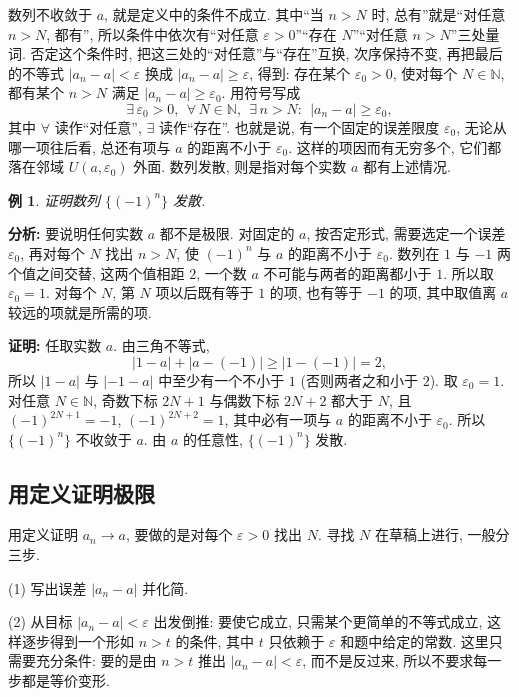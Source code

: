 \documentclass[UTF8,openany]{ctexbook}
\theoremstyle{chinesetextbook}
\newtheorem{example}{例}[section]
\newenvironment{cnproof}{\par\indent\textbf{证明:} \ignorespaces}{\par}
\begin{document}
数列不收敛于 $a$, 就是定义中的条件不成立. 其中“当 $n>N$ 时, 总有”就是“对任意 $n>N$, 都有”, 所以条件中依次有“对任意 $\varepsilon>0$”“存在 $N$”“对任意 $n>N$”三处量词. 否定这个条件时, 把这三处的“对任意”与“存在”互换, 次序保持不变, 再把最后的不等式 $|a_n-a|<\varepsilon$ 换成 $|a_n-a|\ge\varepsilon$, 得到: 存在某个 $\varepsilon_0>0$, 使对每个 $N\in\mathbb N$, 都有某个 $n>N$ 满足 $|a_n-a|\ge\varepsilon_0$. 用符号写成
\[
\exists\,\varepsilon_0>0,\ \ \forall\,N\in\mathbb N,\ \ \exists\,n>N:\ \ |a_n-a|\ge\varepsilon_0,
\]
其中 $\forall$ 读作“对任意”, $\exists$ 读作“存在”. 也就是说, 有一个固定的误差限度 $\varepsilon_0$, 无论从哪一项往后看, 总还有项与 $a$ 的距离不小于 $\varepsilon_0$. 这样的项因而有无穷多个, 它们都落在邻域 $U(a,\varepsilon_0)$ 外面. 数列发散, 则是指对每个实数 $a$ 都有上述情况.
\begin{example}\label{ex:12-div}
证明数列 $\{(-1)^n\}$ 发散.
\end{example}
\par\indent\textbf{分析:} 要说明任何实数 $a$ 都不是极限. 对固定的 $a$, 按否定形式, 需要选定一个误差 $\varepsilon_0$, 再对每个 $N$ 找出 $n>N$, 使 $(-1)^n$ 与 $a$ 的距离不小于 $\varepsilon_0$. 数列在 $1$ 与 $-1$ 两个值之间交替, 这两个值相距 $2$, 一个数 $a$ 不可能与两者的距离都小于 $1$. 所以取 $\varepsilon_0=1$. 对每个 $N$, 第 $N$ 项以后既有等于 $1$ 的项, 也有等于 $-1$ 的项, 其中取值离 $a$ 较远的项就是所需的项.
\begin{cnproof}
任取实数 $a$. 由三角不等式,
\[
|1-a|+|a-(-1)|\ge|1-(-1)|=2,
\]
所以 $|1-a|$ 与 $|-1-a|$ 中至少有一个不小于 $1$ (否则两者之和小于 $2$). 取 $\varepsilon_0=1$. 对任意 $N\in\mathbb N$, 奇数下标 $2N+1$ 与偶数下标 $2N+2$ 都大于 $N$, 且 $(-1)^{2N+1}=-1$, $(-1)^{2N+2}=1$, 其中必有一项与 $a$ 的距离不小于 $\varepsilon_0$. 所以 $\{(-1)^n\}$ 不收敛于 $a$. 由 $a$ 的任意性, $\{(-1)^n\}$ 发散.
\end{cnproof}
\subsection{用定义证明极限}
用定义证明 $a_n\to a$, 要做的是对每个 $\varepsilon>0$ 找出 $N$. 寻找 $N$ 在草稿上进行, 一般分三步.

(1) 写出误差 $|a_n-a|$ 并化简.

(2) 从目标 $|a_n-a|<\varepsilon$ 出发倒推: 要使它成立, 只需某个更简单的不等式成立, 这样逐步得到一个形如 $n>t$ 的条件, 其中 $t$ 只依赖于 $\varepsilon$ 和题中给定的常数. 这里只需要充分条件: 要的是由 $n>t$ 推出 $|a_n-a|<\varepsilon$, 而不是反过来, 所以不要求每一步都是等价变形.
\end{document}
